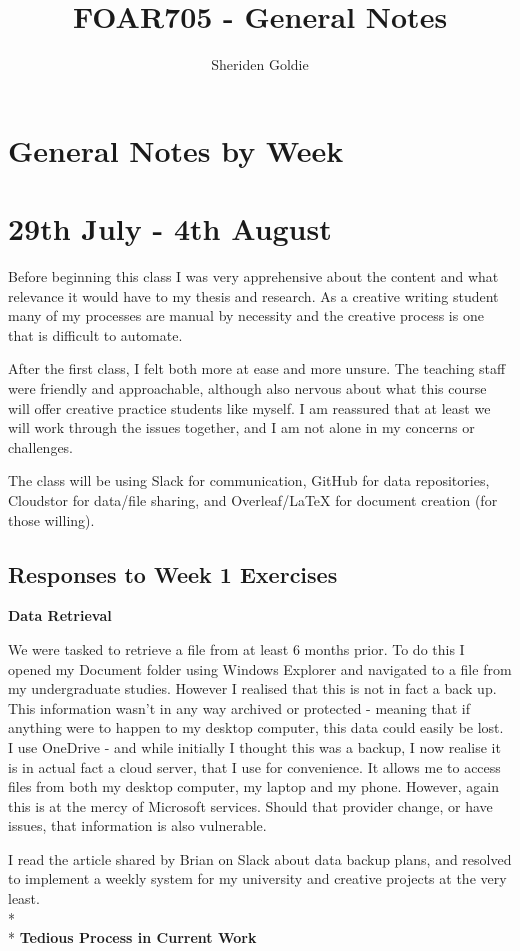 \documentclass{article}
\title{FOAR705 - General Notes}
\author{Sheriden Goldie}
\date{}
\begin{document}
\maketitle


\section*{General Notes by Week}
\section{29th July - 4th August}
Before beginning this class I was very apprehensive about the content and what relevance it would have to my thesis and research. As a creative writing student many of my processes are manual by necessity and the creative process is one that is difficult to automate. 

After the first class, I felt both more at ease and more unsure. The teaching staff were friendly and approachable, although also nervous about what this course will offer creative practice students like myself. I am reassured that at least we will work through the issues together, and I am not alone in my concerns or challenges. 

The class will be using Slack for communication, GitHub for data repositories, Cloudstor for data/file sharing, and Overleaf/LaTeX for document creation (for those willing).

\subsection{Responses to Week 1 Exercises}
\textbf{Data Retrieval}

We were tasked to retrieve a file from at least 6 months prior. 
To do this I opened my Document folder using Windows Explorer and navigated to a file from my undergraduate studies.
However I realised that this is not in fact a back up. This information wasn't in any way archived or protected - meaning that if anything were to happen to my desktop computer, this data could easily be lost.
I use OneDrive - and while initially I thought this was a backup, I now realise it is in actual fact a cloud server, that I use for convenience. It allows me to access files from both my desktop computer, my laptop and my phone. However, again this is at the mercy of Microsoft services. Should that provider change, or have issues, that information is also vulnerable. 

I read the article shared by Brian on Slack about data backup plans, and resolved to implement a weekly system for my university and creative projects at the very least. 
\\*
\\*
\noindent \textbf{Tedious Process in Current Work}
\end{document}
